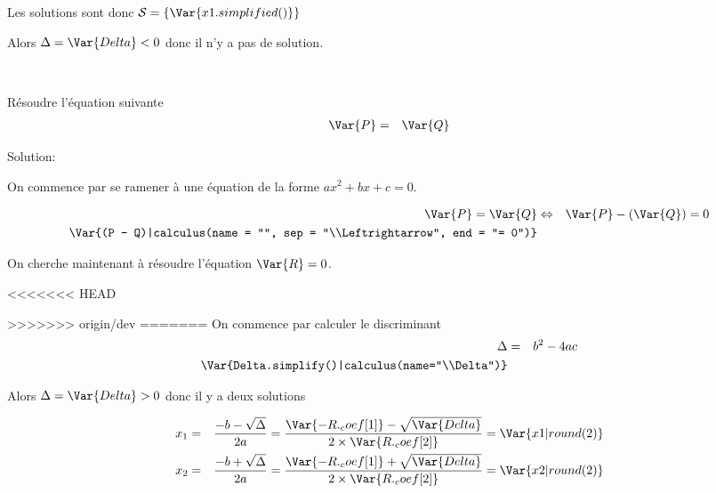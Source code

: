 \documentclass[a4paper,10pt]{article}
\begin{document}
\begin{Exo}
    Les solutions sont donc $\mathcal{S} = \left\{ \Var{x1.simplified()}\right\}$

    Alors $\Delta = \Var{Delta} < 0$ donc il n'y a pas de solution.


    \bigskip
    ~\dotfill
    \bigskip
    
    
    Résoudre l'équation suivante
    \begin{eqnarray*}
        \Var{P} & = & \Var{Q}
    \end{eqnarray*}

    Solution:

    On commence par se ramener à une équation de la forme $ax^2+bx+c = 0$.

    \begin{eqnarray*}
        \Var{P} = \Var{Q} & \Leftrightarrow & \Var{P} - (\Var{Q}) = 0 \\
        \Var{(P - Q)|calculus(name = "", sep = "\\Leftrightarrow", end = "= 0")}
    \end{eqnarray*}

    On cherche maintenant à résoudre l'équation $\Var{R} = 0$.
    
<<<<<<< HEAD
\end{Exo}
>>>>>>> origin/dev
=======
    On commence par calculer le discriminant
    \begin{eqnarray*}
        \Delta & = & b^2-4ac \\
        \Var{Delta.simplify()|calculus(name="\\Delta")}
    \end{eqnarray*}

    Alors $\Delta = \Var{Delta} > 0$ donc il y a deux solutions


    \begin{eqnarray*}
        x_1 & = & \frac{-b - \sqrt{\Delta}}{2a} =  \frac{\Var{-R._coef[1]} - \sqrt{\Var{Delta}}}{2 \times \Var{R._coef[2]}} = \Var{x1 | round(2)} \\
        x_2 & = & \frac{-b + \sqrt{\Delta}}{2a} =  \frac{\Var{-R._coef[1]} + \sqrt{\Var{Delta}}}{2 \times \Var{R._coef[2]}} = \Var{x2 | round(2)}
    \end{eqnarray*}
\end{document}
